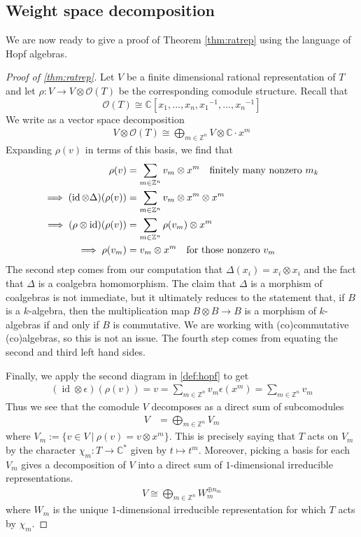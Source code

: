 \documentclass[manuscript, printscheme]{aomart}
\theoremstyle{plain} %
\theoremstyle{definition}
\theoremstyle{remark}
\newcommand{\st}{\ \vert \ }
\newcommand{\cO}{{\mathcal{O}}}
\DeclareMathOperator{\id}{id}
\newcommand{\C}{\mathbb{C}}
\newcommand{\Z}{\mathbb{Z}}
\newcommand{\inv}[1]{{#1}^{-1}}
\newcommand{\mc}[1]{\mathcal{#1}}
\newcommand{\set}[1]{\{#1\}}
\newcommand{\texty}[1]{\text{\quad #1}}
\begin{document}
\subsection{Weight space decomposition}
We are now ready to give a proof of Theorem \ref{thm:ratrep} using the language of Hopf algebras.
\begin{proof}
	[Proof of \ref{thm:ratrep}] Let $V$ be a finite dimensional rational representation of $T$
	and let $\rho: V\to V\otimes \mc O(T)$ be the corresponding comodule structure. Recall that
	\[\cO(T)\cong \C[x_1,\dots,x_n,\inv{x_1},\dots,\inv{x_n}]\] We write as a vector space
	decomposition \begin{align*}
		V \otimes \mc O(T) \cong \bigoplus_{m\in\Z^n} V\otimes \C\cdot x^m
	\end{align*} Expanding $\rho(v)$ in terms of this basis, we find that \begin{align*}
		\rho(v)                                & = \sum_{m\in\Z^n} v_m\otimes x^m \texty{finitely many nonzero $m_k$} \\
		\implies (\id \otimes \Delta)(\rho(v)) & = \sum_{m\in\Z^n} v_m\otimes x^m\otimes x^m                          \\
		\implies (\rho\otimes \id)(\rho(v))    & = \sum_{m\in\Z^n} \rho(v_m)\otimes x^m                               \\
		\implies \rho(v_m)                     & = v_m\otimes x^m \texty{for those nonzero $v_m$}
	\end{align*} The second step comes from our computation that
	$\Delta(x_i) = x_i\otimes x_i$
	and the fact that $\Delta$ is a coalgebra homomorphism. The claim that $\Delta$ is a
	morphism of coalgebras is not immediate, but it ultimately reduces to the statement that, if $B$ is
	a $k$-algebra, then the multiplication map $B\otimes B\to B$ is a morphism of $k$-algebras if and only if $B$ is commutative.
	We are working with (co)commutative (co)algebras, so this is not an issue. The fourth step comes from equating the second and third left hand sides.

	\hfill

	Finally, we apply the second diagram in \ref{def:hopf} to get \begin{align*}
		(\id\otimes \epsilon)(\rho(v)) = v = \sum_{m\in\Z^n} v_m\epsilon(x^m) = \sum_{m\in\Z^n} v_m
	\end{align*} Thus we see that the comodule $V$ decomposes as a direct sum of subcomodules \begin{align*}
		V & = \bigoplus_{m\in\Z^n} V_m
	\end{align*} where $V_m := \set{v\in V \st \rho(v) = v\otimes x^m}$. This is precisely saying that $T$ acts on $V_m$ by the character $\chi_m: T\to \C^*$ given by $t\mapsto t^m$.
	Moreover, picking a basis for each $V_m$ gives a decomposition of $V$ into a direct sum of $1$-dimensional irreducible representations.
	\begin{align*}
		V \cong \bigoplus_{m\in\Z^n} W_m^{\oplus n_m}
	\end{align*} where $W_m$ is the unique $1$-dimensional irreducible representation for which $T$ acts by $\chi_m$.
\end{proof}
\end{document}
